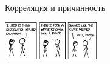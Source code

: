 \documentclass[9pt,pdf,utf8,hyperref={unicode},aspectratio=169]{beamer}
\begin{document}
\begin{frame}{Корреляция и причинность}
		\begin{center}
			\includegraphics[width=0.3\textwidth]{xkcd.png}

\end{center}
\end{frame}
\end{document}
